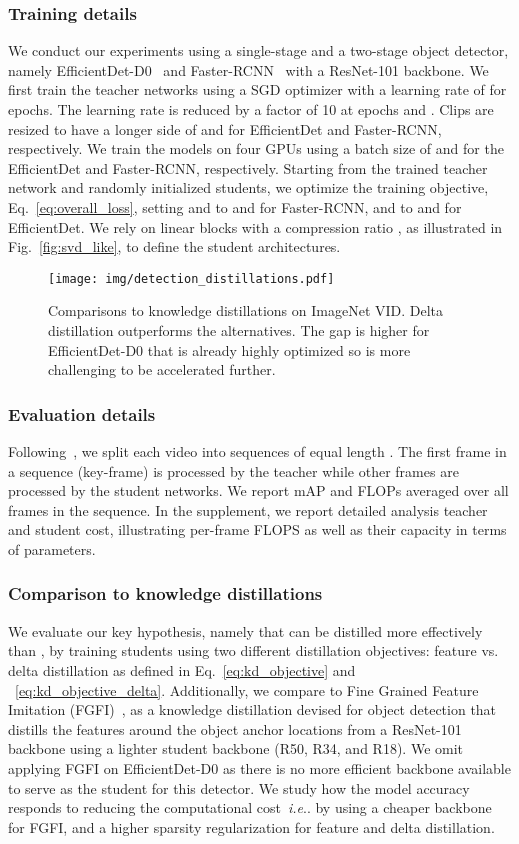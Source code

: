 \documentclass[runningheads]{llncs}
\makeatletter
\DeclareRobustCommand\onedot{\futurelet\@let@token\@onedot}
\def\@onedot{\ifx\@let@token.\else.\null\fi\xspace}
\def\ie{\emph{i.e}\onedot} \def\Ie{\emph{I.e}\onedot}
\makeatother
\begin{document}
\subsubsection{Training details}
We conduct our experiments using a single-stage and a two-stage object detector, namely EfficientDet-D0~\cite{efficientdet} and Faster-RCNN~\cite{fasterrcnn} with a ResNet-101 backbone.
We first train the teacher networks  using a SGD optimizer with a learning rate of  for  epochs. The learning rate is reduced by a factor of 10 at epochs  and . Clips are resized to have a longer side of  and  for EfficientDet and Faster-RCNN, respectively. We train the models on four GPUs using a batch size of  and  for the EfficientDet and Faster-RCNN, respectively.
Starting from the trained teacher network and randomly initialized students, we optimize the training objective, Eq.~\ref{eq:overall_loss}, setting  and  to  and  for Faster-RCNN, and to  and  for EfficientDet. We rely on linear blocks with a compression ratio , as illustrated in Fig.~\ref{fig:svd_like}, to define the student architectures.
\begin{figure}[t!]
\centering
\texttt{[image: img/detection\_distillations.pdf]}
\caption{Comparisons to knowledge distillations on ImageNet VID. Delta distillation outperforms the alternatives. The gap is higher for EfficientDet-D0 that is already highly optimized so is more challenging to be accelerated further.}
\label{fig:feature_vs_delta}
\vspace{-4mm}
\end{figure} \subsubsection{Evaluation details}
Following~\cite{zhu17dff}, we split each video into sequences of equal length . The first frame in a sequence (key-frame) is processed by the teacher while other frames are processed by the student networks. We report mAP and FLOPs averaged over all frames in the sequence.
In the supplement, we report detailed analysis teacher and student cost, illustrating per-frame FLOPS as well as their capacity in terms of parameters.
\subsubsection{Comparison to knowledge distillations}
We evaluate our key hypothesis, namely that  can be distilled more effectively than , by training students using two different distillation objectives: feature vs. delta distillation as defined in Eq.~\ref{eq:kd_objective} and ~\ref{eq:kd_objective_delta}. Additionally, we compare to Fine Grained Feature Imitation (FGFI)~\cite{fgfi}, as a knowledge distillation devised for object detection that distills the features around the object anchor locations from a ResNet-101 backbone using a lighter student backbone (R50, R34, and R18). We omit applying FGFI on EfficientDet-D0 as there is no more efficient backbone available to serve as the student for this detector. We study how the model accuracy responds to reducing the computational cost~\ie by using a cheaper backbone for FGFI, and a higher sparsity regularization  for feature and delta distillation.
\end{document}
